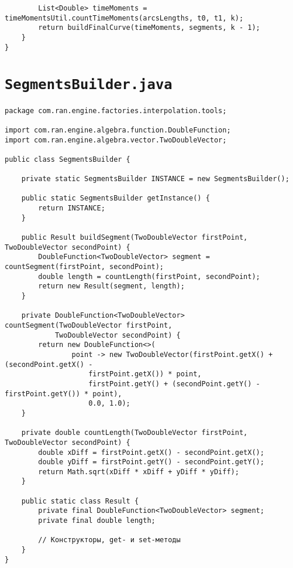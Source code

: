 \begin{verbatim}
        List<Double> timeMoments = timeMomentsUtil.countTimeMoments(arcsLengths, t0, t1, k);
        return buildFinalCurve(timeMoments, segments, k - 1);
    }
}
\end{verbatim}

\section*{\texttt{SegmentsBuilder.java}}
\begin{verbatim}
package com.ran.engine.factories.interpolation.tools;

import com.ran.engine.algebra.function.DoubleFunction;
import com.ran.engine.algebra.vector.TwoDoubleVector;

public class SegmentsBuilder {

    private static SegmentsBuilder INSTANCE = new SegmentsBuilder();

    public static SegmentsBuilder getInstance() {
        return INSTANCE;
    }

    public Result buildSegment(TwoDoubleVector firstPoint, TwoDoubleVector secondPoint) {
        DoubleFunction<TwoDoubleVector> segment = countSegment(firstPoint, secondPoint);
        double length = countLength(firstPoint, secondPoint);
        return new Result(segment, length);
    }

    private DoubleFunction<TwoDoubleVector> countSegment(TwoDoubleVector firstPoint,
            TwoDoubleVector secondPoint) {
        return new DoubleFunction<>(
                point -> new TwoDoubleVector(firstPoint.getX() + (secondPoint.getX() -
                    firstPoint.getX()) * point,
                    firstPoint.getY() + (secondPoint.getY() - firstPoint.getY()) * point),
                    0.0, 1.0);
    }

    private double countLength(TwoDoubleVector firstPoint, TwoDoubleVector secondPoint) {
        double xDiff = firstPoint.getX() - secondPoint.getX();
        double yDiff = firstPoint.getY() - secondPoint.getY();
        return Math.sqrt(xDiff * xDiff + yDiff * yDiff);
    }

    public static class Result {
        private final DoubleFunction<TwoDoubleVector> segment;
        private final double length;

        // Конструкторы, get- и set-методы
    }
}
\end{verbatim}


